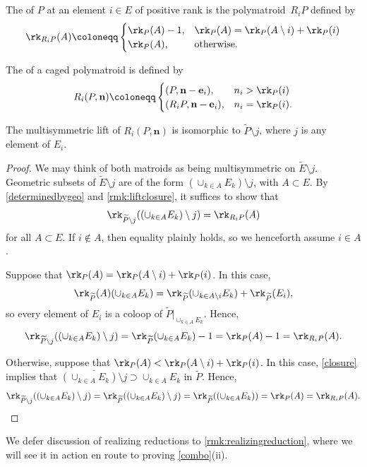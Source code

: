 \subsection{}
The  of $P$ at an element $i \in E$ of positive rank is the polymatroid~$R_i P$ defined by
\[
  \rk_{R_i P}(A) \coloneqq
  \begin{cases} \rk_P(A) - 1, & \rk_P(A) = \rk_P(A \setminus i) + \rk_P(i) \\
     \rk_P(A), & \text{otherwise.}
   \end{cases}
 \]
 
The  of a caged polymatroid is defined by
\[
  R_i(P, \mathbf n) \coloneqq
  \begin{cases}
    (P, \mathbf n - \mathbf e_i), & n_i > \rk_P(i) \\
    (R_i P, \mathbf n - \mathbf e_i), & n_i = \rk_P(i).
  \end{cases}
 \]

\begin{lemm}\label{reductionlift}
   The multisymmetric lift of $R_i(P, \mathbf n)$ is isomorphic to $\widetilde P \setminus j$, where $j$ is any element of $E_i$.
\end{lemm}
\begin{proof}
  We may think of both matroids as being multisymmetric on $\widetilde E \setminus j$.
  Geometric subsets of $\widetilde E \setminus j$ are of the form $(\cup _{k \in A} E_k) \setminus j$, with $A \subset E$.
  By \cref{determinedbygeo} and \cref{rmk:liftclosure}, it suffices to show that
  \[
    \rk_{\widetilde P \setminus j}((\cup_{k \in A} E_k) \setminus j) = \rk_{R_i P}(A)
  \]
  for all $A \subset E$.
  If $i \not \in A$, then equality plainly holds, so we henceforth assume $i \in A$.
  
  Suppose that $\rk_P(A) = \rk_P(A \setminus i) + \rk_P(i)$.
  In this case, 
  \[
  \rk_{\widetilde P}(A)(\cup_{k \in A} E_k) = \rk_{\widetilde P}(\cup_{k \in A \setminus i} E_k) + \rk_{\widetilde P}(E_i),
  \]
  so every element of $E_i$ is a coloop of $\widetilde P |_{\cup_{k \in A} E_k}$.
    Hence,
  \[
    \rk_{\widetilde P \setminus j}((\cup_{k \in A} E_k) \setminus j) = \rk_{\widetilde P}(\cup_{k \in A} E_k) - 1 = \rk_P(A) - 1 = \rk_{R_i P}(A).
  \]
  
  Otherwise, suppose that $\rk_P(A) < \rk_P(A \setminus i) + \rk_P(i)$.
  In this case, \cref{closure} implies that $\overline{(\cup_{k \in A} E_k) \setminus j} \supset \cup_{k \in A} E_k$ in $\widetilde P$.
  Hence,
  \[
    \rk_{\widetilde P \setminus j}((\cup_{k \in A} E_k) \setminus j)
    = \rk_{\widetilde P}((\cup_{k \in A} E_k) \setminus j)
    = \rk_{\widetilde P}((\cup_{k \in A} E_k))
    = \rk_P(A) = \rk_{R_i P}(A).
  \qedhere \]
\end{proof}
We defer discussion of realizing reductions to \cref{rmk:realizingreduction}, where we will see it in action en route to proving \cref{combo}(ii).
